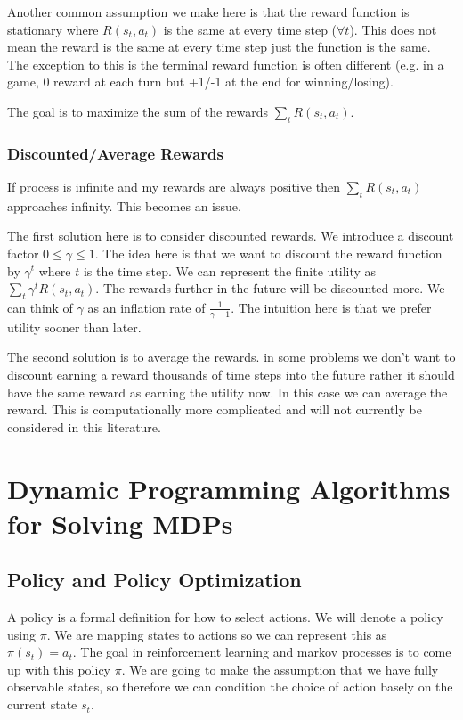 \documentclass[12pt]{article}
\begin{document}
        Another common assumption we make here is that the reward function is stationary where $R(s_t, a_t)$ is the same
        at every time step ($\forall t$). This does not mean the reward is the same at every time step just the function
        is the same. The exception to this is the terminal reward function is often different (e.g. in a game, 0 reward
        at each turn but +1/-1 at the end for winning/losing).

        The goal is to maximize the sum of the rewards $\sum_t R(s_t, a_t)$.

        \subsubsection{Discounted/Average Rewards}
            If process is infinite and my rewards are always positive then $\sum_t R(s_t, a_t)$ approaches infinity.
            This becomes an issue. 

            The first solution here is to consider discounted rewards. We introduce a discount factor $0 \leq \gamma
            \leq 1$. The idea here is that we want to discount the reward function by $\gamma^t$ where $t$ is the time
            step. We can represent the finite utility as $\sum_t \gamma^t R(s_t, a_t)$. The rewards further in the
            future will be discounted more. We can think of $\gamma$ as an inflation rate of $\frac{1}{\gamma - 1}$. The
            intuition here is that we prefer utility sooner than later.

            The second solution is to average the rewards. in some problems we don't want to discount earning a reward
            thousands of time steps into the future rather it should have the same reward as earning the utility now. In
            this case we can average the reward. This is computationally more complicated and will not currently be
            considered in this literature. 

\section{Dynamic Programming Algorithms for Solving MDPs}
    \subsection{Policy and Policy Optimization}
        A policy is a formal definition for how to select actions. We will denote a policy using $\pi$. We are mapping
        states to actions so we can represent this as $\pi(s_t) = a_t$. The goal in reinforcement learning and markov
        processes is to come up with this policy $\pi$. We are going to make the assumption that we have fully
        observable states, so therefore we can condition the choice of action basely on the current state $s_t$.
\end{document}

